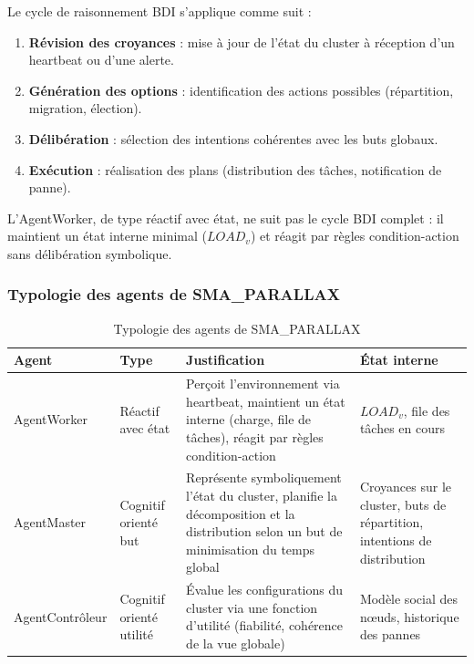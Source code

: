 \documentclass[12pt,a4paper]{report}
\begin{document}
Le cycle de raisonnement BDI s'applique comme suit :

\begin{enumerate}
    \item \textbf{Révision des croyances} : mise à jour de l'état du cluster à réception d'un heartbeat ou d'une alerte.
    \item \textbf{Génération des options} : identification des actions possibles (répartition, migration, élection).
    \item \textbf{Délibération} : sélection des intentions cohérentes avec les buts globaux.
    \item \textbf{Exécution} : réalisation des plans (distribution des tâches, notification de panne).
\end{enumerate}

L'AgentWorker, de type réactif avec état, ne suit pas le cycle BDI complet : il maintient un état interne minimal ($LOAD_v$) et réagit par règles condition-action sans délibération symbolique.

\subsubsection{Typologie des agents de SMA\_PARALLAX}

\begin{table}[H]
\centering
\renewcommand{\arraystretch}{1.3}
\begin{tabular}{|l|l|p{6cm}|l|}
\hline
\textbf{Agent} & \textbf{Type} & \textbf{Justification} & \textbf{État interne} \\
\hline
AgentWorker & Réactif avec état & Perçoit l'environnement via heartbeat, maintient un état interne (charge, file de tâches), réagit par règles condition-action & $LOAD_v$, file des tâches en cours \\
\hline
AgentMaster & Cognitif orienté but & Représente symboliquement l'état du cluster, planifie la décomposition et la distribution selon un but de minimisation du temps global & Croyances sur le cluster, buts de répartition, intentions de distribution \\
\hline
AgentContrôleur & Cognitif orienté utilité & Évalue les configurations du cluster via une fonction d'utilité (fiabilité, cohérence de la vue globale) & Modèle social des nœuds, historique des pannes \\
\hline
\end{tabular}
\caption{Typologie des agents de SMA\_PARALLAX}
\label{tab:typologie_agents}
\end{table}
\end{document}

